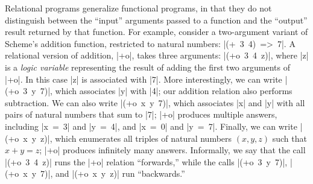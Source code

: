 Relational programs generalize functional programs, in that they do
not distinguish between the ``input'' arguments passed to a function
and the ``output'' result returned by that function.
%
For example, consider a two-argument variant of Scheme's addition function, restricted to natural numbers: \mbox{\scheme|(+ 3 4) => 7|}.
%
A relational version of addition, \scheme|+o|, takes three arguments: \mbox{\scheme|(+o 3 4 z)|},
where \scheme|z| is a \emph{logic variable} representing the result
of adding the first two arguments of \scheme|+o|. In this case
\scheme|z| is associated with \schemeresult|7|.
%
More interestingly, we can write \mbox{\scheme|(+o 3 y 7)|}, which
associates \scheme|y| with \schemeresult|4|; our addition relation
also performs subtraction.
%
We can also write \mbox{\scheme|(+o x y 7)|}, which associates
\scheme|x| and \scheme|y| with all pairs of natural numbers that sum
to \schemeresult|7|; \scheme|+o| produces multiple
answers, including \mbox{\scheme|x = 3|} and \mbox{\scheme|y = 4|}, and
\mbox{\scheme|x = 0|} and \mbox{\scheme|y = 7|}.
%
Finally, we can write \mbox{\scheme|(+o x y z)|}, which enumerates 
all triples of natural numbers $(x, y, z)$ such that $x + y = z$; 
 \scheme|+o| produces infinitely many answers.
%
Informally, we say that the call \mbox{\scheme|(+o 3 4 z)|} runs the \scheme|+o| relation ``forwards,''
while the calls \mbox{\scheme|(+o 3 y 7)|}, \mbox{\scheme|(+o x y 7)|}, and \mbox{\scheme|(+o x y z)|} run ``backwards.''

